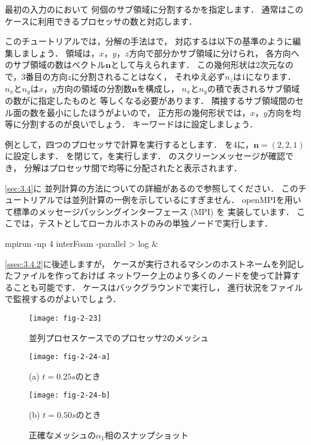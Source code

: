 最初の入力のにおいて
何個のサブ領域に分割するかを指定します．
通常はこのケースに利用できるプロセッサの数と対応します．

このチュートリアルでは，分解の手法はで，
対応するは以下の基準のように編集しましょう．
領域は，$x$，$y$，$z$方向で部分かサブ領域に分けられ，
各方向へのサブ領域の数はベクトル$\bm{n}$として与えられます．
この幾何形状は2次元なので，3番目の方向$z$に分割されることはなく，
それゆえ必ず$n_{z}$は$1$になります．
$n_{x}$と$n_{y}$は$x$，$y$方向の領域の分割数$\bm{n}$を構成し，
$n_{x}$と$n_{y}$の積で表されるサブ領域の数がに指定したものと
等しくなる必要があります．
隣接するサブ領域間のセル面の数を最小にしたほうがよいので，
正方形の幾何形状では，$x$，$y$方向を均等に分割するのが良いでしょう．
キーワードはに設定しましょう．

例として，四つのプロセッサで計算を実行するとします．
を4に，$\bm{n} = (2, 2, 1)$に設定します．
を閉じて，を実行します．
のスクリーンメッセージが確認でき，
分解はプロセッサ間で均等に分配されたと表示されます．

\autoref{sec:3.4}に
並列計算の方法についての詳細があるので参照してください．
このチュートリアルでは並列計算の一例を示しているにすぎません．
openMPIを用いて標準のメッセージパッシングインターフェース (MPI) を
実装しています．
ここでは，テストとしてローカルホストのみの単独ノードで実行します．
\begin{OFverbatim}[terminal]
mpirun -np 4 interFoam -parallel > log &
\end{OFverbatim}
\autoref{ssec:3.4.2}に後述しますが，
ケースが実行されるマシンのホストネームを列記したファイルを作っておけば
ネットワーク上のより多くのノードを使って計算することも可能です．
ケースはバックグラウンドで実行し，
進行状況をファイルで監視するのがよいでしょう．


\begin{figure}[ht]
 \texttt{[image: fig-2-23]}
 \caption{並列プロセスケースでのプロセッサ2のメッシュ}
 \label{fig:2.23}
\end{figure}


\begin{figure}[ht]
 \texttt{[image: fig-2-24-a]}\par
 (a) $t = 0.25\unit{s}$のとき\par
 \medskip
 \texttt{[image: fig-2-24-b]}\par
 (b) $t = 0.50\unit{s}$のとき
 \caption{正確なメッシュの$\alpha_{1}$相のスナップショット}
 \label{fig:2.24}
\end{figure}


